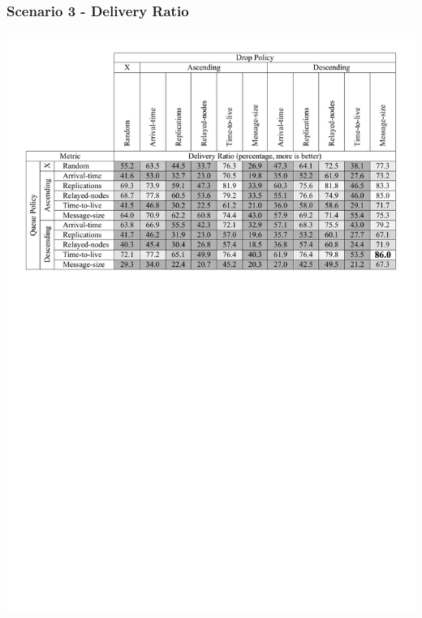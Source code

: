 \begin{frame}
  \frametitle{Scenario 3 - Delivery Ratio}
  \begin{center}
   \includegraphics[width=1.0\textwidth]{fig/tables/scenario3_part1.pdf}
  \end{center}
\end{frame}

